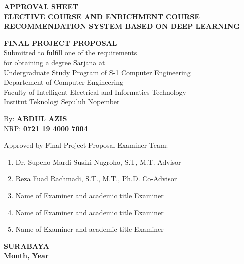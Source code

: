 {
\begin{center}
    \uppercase{\textbf{\large Approval Sheet}} \\

    \vspace*{10mm}
    \uppercase{\textbf{Elective Course and Enrichment course recommendation system based on Deep Learning}}
    \vspace*{10mm}

    {
        \uppercase{\textbf{Final Project Proposal}} \\
        Submitted to fulfill one of the requirements                  \\
        for obtaining a degree Sarjana at                             \\
        Undergraduate Study Program of S-1 Computer Engineering       \\
        Departement of Computer Engineering                            \\
        Faculty of Intelligent Electrical and Informatics Technology  \\
        Institut Teknologi Sepuluh Nopember                           \\
    }

    \vspace*{1.5cm}
    By: \textbf{\uppercase{Abdul Azis}}                                       \\
    NRP: \textbf{0721 19 4000 7004}                               \\
    \vspace*{1.5cm}

    Approved by Final Project Proposal Examiner Team:             \\
    \vspace*{5mm}

    \begin{enumerate}
        \setlength\itemsep{1.5em}
        \item Dr. Supeno Mardi Susiki Nugroho, S.T, M.T. \hfill Advisor
        \item Reza Fuad Rachmadi, S.T., M.T., Ph.D. \hfill Co-Advisor
        \item Name of Examiner and academic title \hfill Examiner
        \item Name of Examiner and academic title \hfill Examiner
        \item Name of Examiner and academic title \hfill Examiner
    \end{enumerate}

    \vspace*{1.5cm}
    \uppercase{\textbf{surabaya}}                      \\
    \textbf{Month, Year}                               \\

\end{center}
}